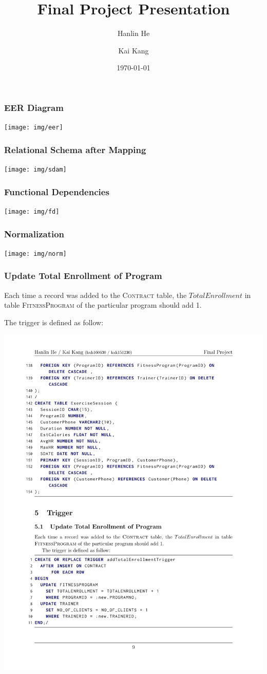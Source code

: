 \documentclass{beamer}
\title{Final Project Presentation}
\author{Hanlin He \and Kai Kang}
\institute{University of Texas at Dallas}
\date{\today}
\begin{document}
\frame{\titlepage}

\begin{frame}
\frametitle{EER Diagram}
\centering
\texttt{[image: img/eer]}
\end{frame}

\begin{frame}
\frametitle{Relational Schema after Mapping}
\centering
\texttt{[image: img/sdam]}
\end{frame}

\begin{frame}
\frametitle{Functional Dependencies}
\centering
\texttt{[image: img/fd]}
\end{frame}

\begin{frame}
\frametitle{Normalization}
\centering
\texttt{[image: img/norm]}
\end{frame}

\begin{frame}
\frametitle{Update Total Enrollment of Program}
Each time a record was added to the \textsc{Contract} table,
the $TotalEnrollment$ in table \textsc{FitnessProgram} of the particular program should add 1.

The trigger is defined as follow:

\includegraphics[width=\textwidth]{src/addTotalEnrollmentTrigger}
\end{frame}
\end{document}
